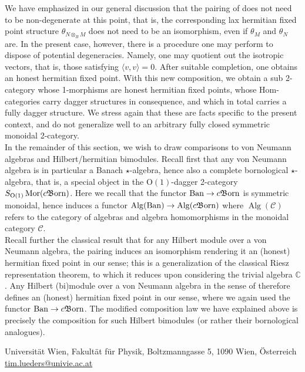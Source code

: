 \documentclass{article}
\newcommand{\Ban}{\operatorname{Ban}}%
\newcommand{\Mor}{\operatorname{Mor}}%
\newcommand{\cBorn}{c\mathfrak{B}\hspace{-0.05cm}\operatorname{orn}}%
\newcommand{\Alg}{\operatorname{Alg}}%
\newcommand{\Oone}{\operatorname{O(1)}}
\newcommand{\C}{\mathcal{C}}
\numberwithin{equation}{section}
\theoremstyle{definition}
\theoremstyle{theorem}
\begin{document}
We have emphasized in our general discussion that the pairing of  does not need to be non-degenerate 
at this point, that is, the corresponding lax hermitian fixed point structure $\theta_{N \otimes_B M}$ does not need 
to be an isomorphism, even if $\theta_M$ and $\theta_N$ are. In the present case, however, there is a procedure one may perform to dispose of potential 
degeneracies. Namely, one may quotient out the isotropic vectors, that is, those satisfying $\langle v,v \rangle = 0$. After suitable completion, 
one obtains an honest hermitian fixed point. With this new composition, we obtain a sub 2-category 
whose 1-morphisms are honest hermitian fixed points, whose Hom-categories carry dagger structures in consequence, and which 
in total carries a fully dagger structure. We stress again that these are facts specific to the present context, and do not generalize well 
to an arbitrary fully closed symmetric monoidal 2-category.\\

In the remainder of this section, we wish to draw comparisons to von Neumann algebras and Hilbert/hermitian bimodules. Recall first that any von Neumann 
algebra is in particular a Banach $\star$-algebra, hence also a complete bornological $\star$-algebra, that is, a special object in the $\Oone$-dagger 2-category 
$S_{\Oone}\Mor(\cBorn)$. Here we recall that the functor $\Ban \to \cBorn$ is symmetric monoidal, hence induces a functor $\Alg(\Ban) \to \Alg(\cBorn)$ where 
$\Alg(\C)$ refers to the category of algebras and algebra homomorphisms in the monoidal category $\C$. \\
Recall further the classical result \cite[Theorem 3.2]{Paschke1973} that for any Hilbert module over a von Neumann algebra, the pairing induces an isomorphism 
rendering it an (honest) hermitian fixed point in our sense; this is a generalization of the classical Riesz representation theorem, to which it reduces upon 
considering the trivial algebra $\mathbb{C}$. Any Hilbert (bi)module over a von Neumann algebra in the sense of \cite{Paschke1973,Paschke1974} therefore defines 
an (honest) hermitian fixed point in our sense, where we again used the functor $\Ban \to \cBorn$. The modified composition law we have explained above is precisely 
the composition for such Hilbert bimodules (or rather their bornological analogues).


\printbibliography

\medskip 

\noindent
Universität Wien, Fakultät für Physik, Boltzmanngasse 5, 1090 Wien, Österreich\\
\href{mailto:tim.lueders@univie.ac.at}{tim.lueders@univie.ac.at}
\end{document}

